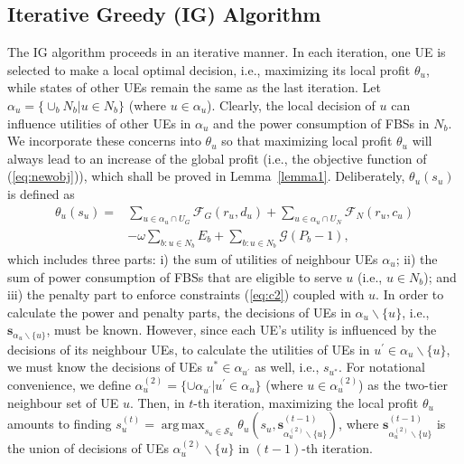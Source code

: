 \documentclass[conference]{IEEEtran}
\DeclareMathOperator*{\argmax}{arg\,max}
\begin{document}
\subsection{Iterative Greedy (IG) Algorithm}




The IG algorithm proceeds in an iterative manner. In each iteration, one UE is selected to make a local optimal decision, i.e., maximizing its local profit $\theta_u$, while states of other UEs remain the same as the last iteration. Let $\alpha_u = \{\cup_{b}N_b | u\in N_b\}$ (where $u\in \alpha_u$). Clearly, the local decision of $u$ can influence utilities of other UEs in $\alpha_u$ and the power consumption of FBSs in $N_b$. We incorporate these concerns into $\theta_u$ so that maximizing local profit $\theta_u$ will always lead to an increase of the global profit (i.e., the objective function of (\ref{eq:newobj})), which shall be proved in Lemma~\ref{lemma1}. Deliberately, $\theta_u(s_u)$ is defined as 
\begin{equation}
\begin{split}
\theta_u(s_u) = & \sum\limits_{u\in \alpha_u \cap U_G} \mathcal{F}_G (r_u,d_u) + \sum\limits_{u\in \alpha_u \cap U_N} \mathcal{F}_N (r_u,c_u)\\ & -\omega \sum\limits_{b:u\in N_b} E_b 
+ \sum\limits_{b: u\in N_b}\mathcal{G}(P_b-1),
\end{split}
\label{theta}
\end{equation}
which includes three parts: i) the sum of utilities of neighbour UEs $\alpha_u$; ii) the sum of power consumption of FBSs that are eligible to serve $u$ (i.e., $u\in N_b$); and iii) the penalty part to enforce constraints (\ref{eq:c2}) coupled with $u$. In order to calculate the power and penalty parts, the decisions of UEs in $\alpha_u\backslash \{u\}$, i.e., $\mathbf{s}_{\alpha_u\backslash \{u\}}$, must be known. However, since each UE's utility is influenced by the decisions of its neighbour UEs, to calculate the utilities of UEs in $u^{\prime}\in \alpha_u\backslash \{u\}$, we must know the decisions of UEs $u^{*}\in \alpha_{u^{\prime}}$ as well, i.e., $s_{u^{*}}$. For notational convenience, we define $\alpha^{(2)}_u = \{\cup \alpha_{u^{\prime}}| {u^{\prime} \in \alpha_u} \}$ (where $u\in \alpha^{(2)}_u$) as the two-tier neighbour set of UE $u$. Then, in $t$-th iteration, maximizing the local profit $\theta_u$ amounts to finding ${s_u^{(t)}} = \argmax_{s_u \in \mathcal{S}_u}\theta_u(s_u, \boldsymbol{s}_{\alpha^{(2)}_u \backslash \{u\}}^{(t-1)})$, where $\boldsymbol{s}_{\alpha^{(2)}_u \backslash \{u\}}^{(t-1)}$ is the union of decisions of UEs $\alpha^{(2)}_u \backslash \{u\}$ in $(t-1)$-th iteration.
\end{document}
